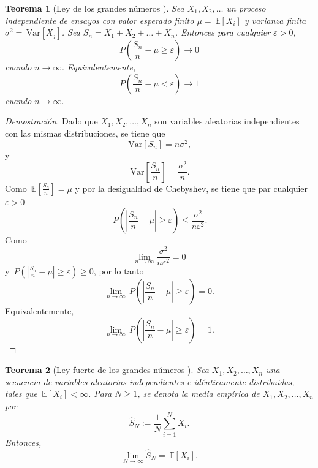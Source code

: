 \documentclass[12pt,letterpaper]{article}
\newcommand\var[1]{\, \mathrm{Var}\left\lbrack #1 \right\rbrack}
\newcommand\pr[1]{\, P \left( #1 \right)}
\newcommand\esp[1]{\, \mathbb{E} \left\lbrack #1 \right\rbrack}
\newtheorem{teo}{Teorema}
\begin{document}
\begin{teo}[Ley de los grandes números \cite{snell}]
Sea $X_1, X_2, \ldots $ un proceso independiente de ensayos con valor esperado finito $\mu = \esp{X_{i}}$ y varianza finita $\sigma^2 = \var{X_{j}}$. Sea $S_{n} = X_1 + X_2 + \ldots + X_n$. Entonces para cualquier $\varepsilon >0$,
\begin{equation}
P\left(\frac{S_n}{n} - \mu \geqslant \varepsilon \right) \longrightarrow 0
\end{equation}
cuando $n\longrightarrow \infty$. Equivalentemente,
\begin{equation}
P \left( \frac{S_n}{n} - \mu < \varepsilon \right) \longrightarrow 1
\end{equation}
cuando $n \longrightarrow \infty.$
\end{teo}
\begin{proof}[Demostración]
Dado que $X_1, X_2, \ldots, X_n$ son variables aleatorias independientes con las mismas distribuciones, se tiene que 
\begin{equation}
\var{S_n} = n \sigma^2,
\end{equation}
y
\begin{equation}
\var{\frac{S_n}{n}} = \frac{\sigma^2}{n}. 
\end{equation}
Como $\esp{\frac{S_n}{n}}=\mu$ y por la desigualdad de Chebyshev, se tiene que par cualquier $\varepsilon > 0$
\begin{equation}
\pr{\left\vert \frac{S_n}{n} - \mu \right\vert \geqslant \varepsilon} \leqslant \frac{\sigma^2}{n\varepsilon^2}.
\end{equation}
Como 
\begin{equation}
\lim\limits_{n \rightarrow \infty} \frac{\sigma^2}{n\varepsilon^2} = 0
\end{equation}
y $\pr{\left\vert \frac{S_n}{n} - \mu \right\vert \geqslant \varepsilon} \geqslant 0$, por lo tanto
\begin{equation}
\lim\limits_{n\rightarrow \infty} \pr{\left\vert \frac{S_n}{n} - \mu \right\vert \geqslant \varepsilon} = 0.
\end{equation} 
Equivalentemente, 
\begin{equation}
\lim\limits_{n \rightarrow \infty} \pr{\left\vert \frac{S_n}{n} - \mu \right\vert \geqslant \varepsilon} = 1.
\end{equation}
\end{proof}

\begin{teo}[Ley fuerte de los grandes números \cite{stochastic_simulation}]
Sea $X_1, X_2, \ldots, X_n$ una secuencia de variables aleatorias independientes e idénticamente distribuidas, tales que $\esp{X_i} < \infty$. Para $N \geqslant 1$, se denota la media empírica de $X_1, X_2, \ldots, X_n$ por
\begin{equation}
\hat{S}_N := \frac{1}{N} \sum^{N}_{i = 1} X_i.
\end{equation}
Entonces,
\begin{equation}
\lim\limits_{N \longrightarrow \infty} \hat{S}_N = \esp{X_i}.
\end{equation}
\end{teo}
\end{document}
